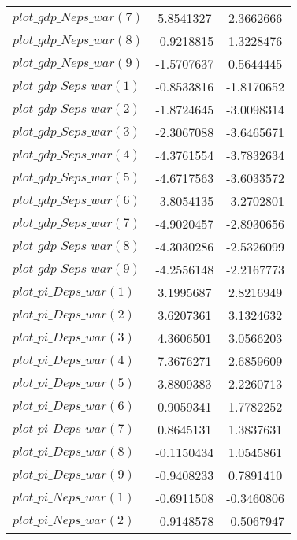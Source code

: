 \begin{center}
\begin{longtable}{lcc}
$plot\_gdp\_N eps\_war (7)  $	 & 	      5.8541327	 & 	      2.3662666 \\ 
$plot\_gdp\_N eps\_war (8)  $	 & 	     -0.9218815	 & 	      1.3228476 \\ 
$plot\_gdp\_N eps\_war (9)  $	 & 	     -1.5707637	 & 	      0.5644445 \\ 
$plot\_gdp\_S eps\_war (1)  $	 & 	     -0.8533816	 & 	     -1.8170652 \\ 
$plot\_gdp\_S eps\_war (2)  $	 & 	     -1.8724645	 & 	     -3.0098314 \\ 
$plot\_gdp\_S eps\_war (3)  $	 & 	     -2.3067088	 & 	     -3.6465671 \\ 
$plot\_gdp\_S eps\_war (4)  $	 & 	     -4.3761554	 & 	     -3.7832634 \\ 
$plot\_gdp\_S eps\_war (5)  $	 & 	     -4.6717563	 & 	     -3.6033572 \\ 
$plot\_gdp\_S eps\_war (6)  $	 & 	     -3.8054135	 & 	     -3.2702801 \\ 
$plot\_gdp\_S eps\_war (7)  $	 & 	     -4.9020457	 & 	     -2.8930656 \\ 
$plot\_gdp\_S eps\_war (8)  $	 & 	     -4.3030286	 & 	     -2.5326099 \\ 
$plot\_gdp\_S eps\_war (9)  $	 & 	     -4.2556148	 & 	     -2.2167773 \\ 
$plot\_pi\_D eps\_war (1)   $	 & 	      3.1995687	 & 	      2.8216949 \\ 
$plot\_pi\_D eps\_war (2)   $	 & 	      3.6207361	 & 	      3.1324632 \\ 
$plot\_pi\_D eps\_war (3)   $	 & 	      4.3606501	 & 	      3.0566203 \\ 
$plot\_pi\_D eps\_war (4)   $	 & 	      7.3676271	 & 	      2.6859609 \\ 
$plot\_pi\_D eps\_war (5)   $	 & 	      3.8809383	 & 	      2.2260713 \\ 
$plot\_pi\_D eps\_war (6)   $	 & 	      0.9059341	 & 	      1.7782252 \\ 
$plot\_pi\_D eps\_war (7)   $	 & 	      0.8645131	 & 	      1.3837631 \\ 
$plot\_pi\_D eps\_war (8)   $	 & 	     -0.1150434	 & 	      1.0545861 \\ 
$plot\_pi\_D eps\_war (9)   $	 & 	     -0.9408233	 & 	      0.7891410 \\ 
$plot\_pi\_N eps\_war (1)   $	 & 	     -0.6911508	 & 	     -0.3460806 \\ 
$plot\_pi\_N eps\_war (2)   $	 & 	     -0.9148578	 & 	     -0.5067947 \\ 

\end{longtable}
\end{center}
